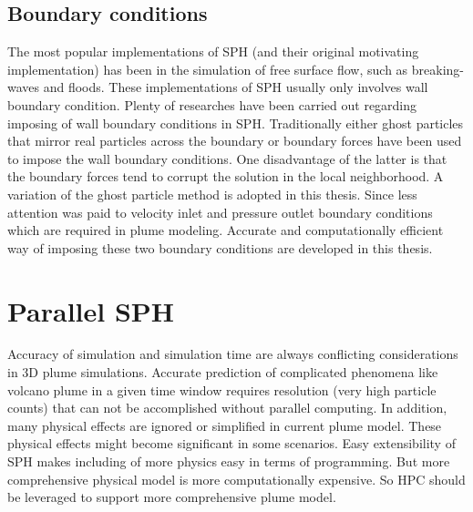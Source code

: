 \subsection{Boundary conditions}
The most popular implementations of SPH (and their original motivating implementation) has been in the simulation of free surface flow, such as breaking-waves and floods. These implementations of SPH usually only involves wall boundary condition. Plenty of researches have been carried out regarding imposing of wall boundary conditions in SPH. Traditionally either ghost particles that mirror real particles across the boundary \citep {ferrari2009new} or boundary forces \citep {monaghan2009sph} have been used to impose the wall boundary conditions. One disadvantage of the latter  is that the boundary forces tend to corrupt the solution in the local neighborhood. A variation \citep {kumar2013parallel} of the ghost particle method is adopted in this thesis. Since less attention was paid to velocity inlet and pressure outlet boundary conditions which are required in plume modeling. Accurate and computationally efficient way of imposing these two boundary conditions are developed in this thesis.

\section{Parallel SPH}

Accuracy of simulation and simulation time are always conflicting considerations in 3D plume simulations. Accurate prediction of complicated phenomena like volcano plume in a given time window requires resolution (very high particle counts) that can not be accomplished without parallel computing. In addition, many physical effects are ignored or simplified in current plume model. These physical effects might become significant in some scenarios. Easy extensibility of SPH makes including of more physics easy in terms of programming. But more comprehensive physical model is more computationally expensive. So HPC should be leveraged to support more comprehensive plume model.

